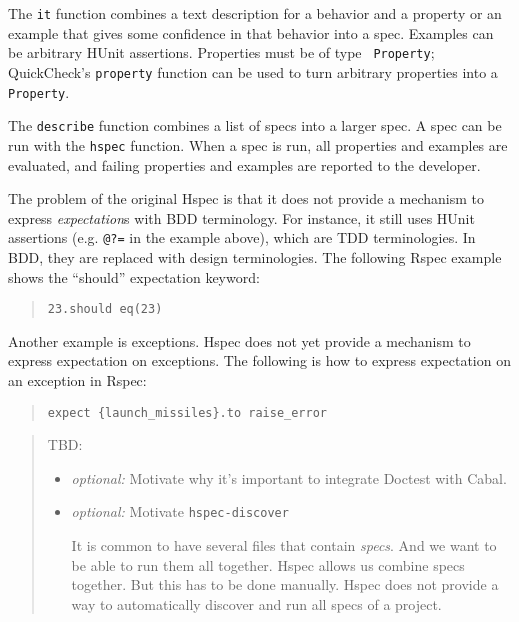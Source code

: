 \documentclass[preprint]{sigplanconf}
\begin{document}
\noindent The {\tt it} function combines a text description for a
behavior and a property or an example that gives some confidence in
that behavior into a spec.
Examples can be arbitrary HUnit assertions.  Properties must be of type {\tt
Property}; QuickCheck's \texttt{property} function can be used to turn
arbitrary properties into a \texttt{Property}.

The \texttt{describe} function combines a list of specs into a larger spec.
A spec can be run with the \texttt{hspec} function.  When a spec is
run, all properties and examples are evaluated, and failing properties
and examples are reported to the developer.

The problem of the original Hspec is that it does not provide
a mechanism to express \emph{expectation}\/s with
BDD terminology.
For instance,
it still uses HUnit
assertions (e.g. \verb|@?=| in the example above), which are TDD
terminologies. In BDD, they are replaced with design terminologies.
The following Rspec example shows the ``should'' expectation keyword:

\begin{quote}
\small
\begin{verbatim}
23.should eq(23)
\end{verbatim}
\end{quote}

\noindent Another example is exceptions. Hspec does not yet provide a
mechanism to express expectation on exceptions. The following is
how to express expectation on an exception in Rspec:

\begin{quote}
\small
\begin{verbatim}
expect {launch_missiles}.to raise_error
\end{verbatim}
\end{quote}

\begin{quote}
    TBD:
\begin{itemize}
    \item \emph{optional:} Motivate why it's important to integrate
        Doctest with
        Cabal.

    \item \emph{optional:} Motivate \verb|hspec-discover|

        It is common to have several files that contain \emph{specs}.
        And we want to be able to run them all together.  Hspec allows
        us combine specs together.  But this has to be done manually.
        Hspec does not provide a way to automatically discover and run
        all specs of a project.
\end{itemize}
\end{quote}
\end{document}
